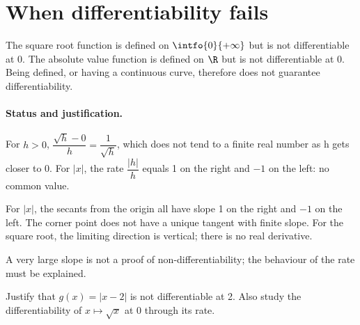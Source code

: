 \section{When differentiability fails}\label{C04-U4}
\begin{keypoint}
The square root function is defined on $\intfo{0}{+\infty}$ but is not differentiable at 0. The absolute value function is defined on $\R$ but is not differentiable at 0. Being defined, or having a continuous curve, therefore does not guarantee differentiability.
\end{keypoint}
\paragraph{Status and justification.} For $h>0$, $\dfrac{\sqrt h-0}{h}=\dfrac{1}{\sqrt h}$, which does not tend to a finite real number as h gets closer to 0. For $|x|$, the rate $\dfrac{|h|}{h}$ equals 1 on the right and $-1$ on the left: no common value.
\begin{example}For $|x|$, the secants from the origin all have slope 1 on the right and $-1$ on the left. The corner point does not have a unique tangent with finite slope. For the square root, the limiting direction is vertical; there is no real derivative.\end{example}\label{C04-EX4}
\begin{pitfall}A very large slope is not a proof of non-differentiability; the behaviour of the rate must be explained.\end{pitfall}
\begin{application}Justify that $g(x)=|x-2|$ is not differentiable at 2. Also study the differentiability of $x\mapsto\sqrt{x}$ at 0 through its rate.\end{application}\label{C04-AP4}
\mxnewpage
